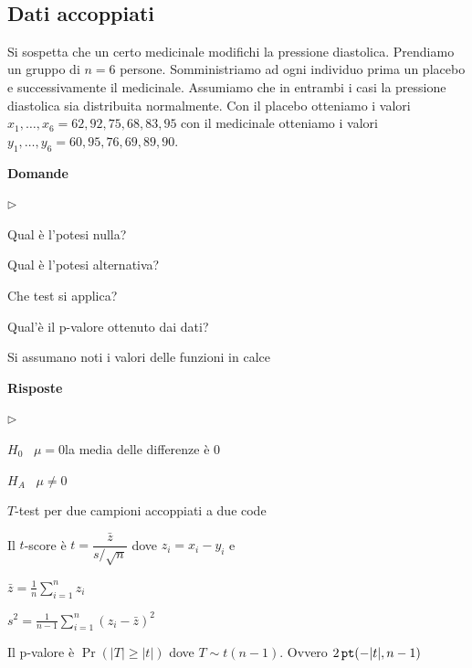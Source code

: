 \documentclass[11pt,openany]{book}
\newcommand{\mylabel}[1]{{\footnotesize\textsf{#1}}\hfill}
\renewenvironment{itemize}
  {\begin{list}{$\triangleright$}{%
   \setlength{\parskip}{0mm}
   \setlength{\topsep}{.2\baselineskip}
   \setlength{\rightmargin}{0mm}
   \setlength{\listparindent}{0mm}
   \setlength{\itemindent}{0mm}
   \setlength{\labelwidth}{3ex}
   \setlength{\itemsep}{.4\baselineskip}
   \setlength{\parsep}{0mm}
   \setlength{\partopsep}{0mm}
   \setlength{\labelsep}{1ex}
   \setlength{\leftmargin}{\labelwidth+\labelsep}
   \let\makelabel\mylabel}}{%
   \end{list}\vspace*{-1.3mm}}
\begin{document}
\clearpage\
\subsection{Dati accoppiati}

Si sospetta che un certo medicinale modifichi la pressione diastolica.  Prendiamo un gruppo di $n=6$ persone. Somministriamo ad ogni individuo prima un placebo e successivamente il medicinale. Assumiamo che in entrambi i casi la pressione diastolica sia distribuita normalmente. Con il placebo otteniamo i valori $x_1,\dots,x_6=62,92,75,68,83,95$ con il medicinale otteniamo i valori $y_1,\dots,y_6=60,95,76,69,89,90$.


\textbf{Domande}

\begin{itemize}
  \item[1.] Qual è l'potesi nulla?
  
  \item[2.] Qual è l'potesi alternativa?
  
  \item[3.] Che test si applica?
  
  \item[4.] Qual'è il p-valore ottenuto dai dati?
  \end{itemize}
  
  Si assumano noti i valori delle funzioni in calce
  
  \textbf{Risposte}

\begin{itemize}
\item[1.] $H_0$ \ $\mu = 0$\hfill la media delle differenze è $0$

\item[2.] $H_A$ \ $\mu\neq0$

\item[3.] $T$-test per due campioni accoppiati a due code

\item[4.] Il $t$-score è 
$t = \dfrac{\bar z}{s/\sqrt{n}}$ dove $z_i=x_i-y_i$ e

$\displaystyle\bar z = \frac1{n}\sum^n_{i=1}z_i$

$\displaystyle s^2= \frac1{n-1}\sum^n_{i=1}(z_i-\bar z)^2$

\item[4.] Il p-valore è $\Pr(|T|\ge |t|)$ dove $T\sim t(n-1)$.
Ovvero $2\,{\tt pt}(-|t|, n-1)$
\end{itemize}

\end{document}

